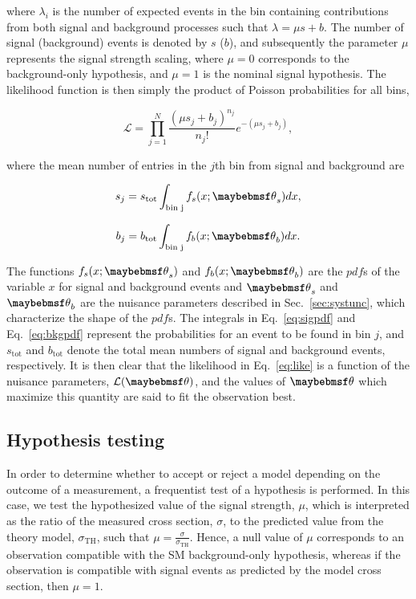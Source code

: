 where $\lambda_{i}$ is the number of expected events in the bin containing contributions from both signal and background processes such that $\lambda = \mu s + b$. The number of signal (background) events is denoted by $s$ ($b$), and subsequently the parameter $\mu$ represents the signal strength scaling, where $\mu=0$ corresponds to the background-only hypothesis, and $\mu=1$ is the nominal signal hypothesis. The likelihood function is then simply the product of Poisson probabilities for all bins,

\begin{equation}
  \mathcal{L} = \prod_{j=1}^{N}\frac{(\mu s_{j}+b_{j})^{n_j}}{n_{j}!}e^{-(\mu s_j + b_j)},
  \label{eq:like}
\end{equation}

where the mean number of entries in the $j$th bin from signal and background are

\begin{equation}
  s_{j}  = s_{\textrm{tot}}\int_{\textrm{bin j}} f_{s}(x;\textbf{\theta}_{s})dx, 
\label{eq:sigpdf}
\end{equation}

\begin{equation}
  b_{j}  = b_{\textrm{tot}}\int_{\textrm{bin j}} f_{b}(x;\textbf{\theta}_{b})dx. 
\label{eq:bkgpdf}
\end{equation}

The functions $f_{s}(x;\textbf{\theta}_{s})$ and $f_{b}(x;\textbf{\theta}_{b})$ are the $pdf$s of the variable $x$ for signal and background events and $\textbf{\theta}_s$ and $\textbf{\theta}_b$ are the nuisance parameters described in Sec.~\ref{sec:systunc}, which characterize the shape of the $pdf$s. The integrals in Eq.~\ref{eq:sigpdf} and Eq.~\ref{eq:bkgpdf} represent the probabilities for an event to be found in bin $j$, and $s_\mathrm{tot}$ and $b_\mathrm{tot}$ denote the total mean numbers of signal and background events, respectively. It is then clear that the likelihood in Eq.~\ref{eq:like} is a function of the nuisance parameters, $\mathcal{L}(\textbf{\theta})$, and the values of $\textbf{\theta}$ which maximize this quantity are said to fit the observation best.

\subsection{Hypothesis testing}
\label{subsec:hypothesis}

In order to determine whether to accept or reject a model depending on the outcome of a measurement, a frequentist test of a hypothesis is performed. In this case, we test the hypothesized value of the signal strength, $\mu$, which is interpreted as the ratio of the measured cross section, $\sigma$, to the predicted value from the theory model, $\sigma_{\textrm{TH}}$, such that $\mu=\frac{\sigma}{\sigma_{\textrm{TH}}}$. Hence, a null value of $\mu$ corresponds to an observation compatible with the SM background-only hypothesis, whereas if the observation is compatible with signal events as predicted by the model cross section, then $\mu=1$. 

